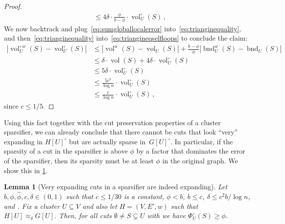 \documentclass[epsfig,letter,11pt]{article}
\numberwithin{equation}{section}
\DeclareMathOperator{\vol}{vol}
\newcommand{\unbor}[2]{\operatorname{bnd}_{#2} (#1)}
\newcommand{\wbor}[2]{\operatorname{bnd}_{#2}^w (#1)}
\newcommand{\unvolc}[2]{\operatorname{vol}_{#2}^\circ (#1)}
\newcommand{\wvolc}[2]{\operatorname{vol}_{#2}^{\circ \,w} (#1)}
\newcommand{\unspc}[2]{\Phi_{#2}^\circ (#1)}
\newcommand{\wspc}[2]{\Phi_{#2}^{\circ \,w} (#1)}
\newcommand{\wvol}[1]{\operatorname{vol}^{w} (#1)}
\renewcommand{\hat}{\widehat}
\newtheorem{lemma}[theorem]{Lemma}
\begin{document}
\begin{proof}
\begin{align}
		& \le 4\delta\cdot\frac{\phi}{b-\phi} \cdot \vol_U^{\circ}(S) \, , \label{eq:sumgloballocalerror}
	\end{align}
We now backtrack and plug~\eqref{eq:sumgloballocalerror} into~\eqref{eq:trianginequality}, and then~\eqref{eq:trianginequality} into~\eqref{eq:triangineqselfloops} to conclude the claim:
	\begin{align*}
		\left|\wvolc{S}{U}- \unvolc{S}{U}\right| & \le \left|\wvol{S}- \vol_U(S)\right| + \frac{b-\phi}{\phi}\left|\wbor{S}{U} - \unbor{S}{U}\right| \\
		& \le \delta \cdot \vol(S) + 4\delta \cdot \vol_U^{\circ}(S) \\
		& \le 5\delta \cdot \vol_U^{\circ}(S) \\
		& \le \frac{5c^2}{\log n}\cdot \unvolc{S}{U} \\
		& \le \frac{c}{\log n}\cdot \unvolc{S}{U} \, ,
	\end{align*}
since $c \le 1/5$.
\end{proof}
\noindent
Using this fact together with the cut preservation properties of a cluster sparsifier, we can already conclude that there cannot be cuts that look ``very'' expanding in $H[U]^\circ$ but are actually sparse in~$G[U]^\circ$. In particular, if the sparsity of a cut in the sparsifier is above $\phi$ by a factor that dominates the error of the sparsifier, then its sparsity must be at least $\phi$ in the original graph. We show this in \cref{lem:iffsparsity}.
\begin{lemma}[Very expanding cuts in a sparsifier are indeed expanding]
	\label{lem:iffsparsity}
	Let $b, \phi,\hat{\phi}, c,\delta \in (0,1)$ such that $c \leq 1/30$ is a constant, $\phi < b$, $b \le c$, $\delta \le c^2 b/ \log n$, and \smash{$\hat{\phi} \ge (1+\frac{1}{3\log n})\cdot \phi$}.  Fix a cluster $U \subseteq V$ and also let $H=(V,E',w)$ such that $H[U] \approx_\delta G[U]$. Then, for all cuts $\emptyset \neq S \subsetneq U$ with \smash{$\wspc{S}{U} \ge \hat{\phi}$} we have $\unspc{S}{U} \ge \phi$.
\end{lemma}
\end{document}
